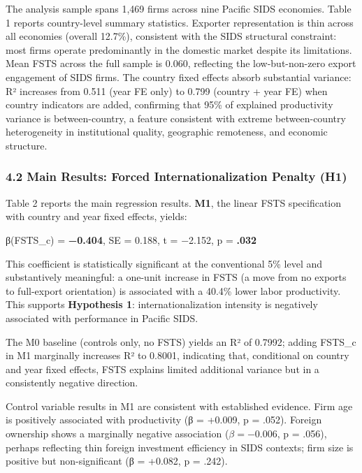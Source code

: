 \documentclass[12pt,a4paper]{article}
\begin{document}
The analysis sample spans 1,469 firms across nine Pacific SIDS
economies. Table 1 reports country-level summary statistics. Exporter
representation is thin across all economies (overall 12.7\%), consistent
with the SIDS structural constraint: most firms operate predominantly in
the domestic market despite its limitations. Mean FSTS across the full
sample is 0.060, reflecting the low-but-non-zero export engagement of
SIDS firms. The country fixed effects absorb substantial variance: R²
increases from 0.511 (year FE only) to 0.799 (country + year FE) when
country indicators are added, confirming that 95\% of explained
productivity variance is between-country, a feature consistent with
extreme between-country heterogeneity in institutional quality,
geographic remoteness, and economic structure.

\hypertarget{42-main-results-forced-internationalization-penalty-h1}{%
\subsubsection{4.2 Main Results: Forced Internationalization Penalty
(H1)}\label{42-main-results-forced-internationalization-penalty-h1}}

Table 2 reports the main regression results. \textbf{M1}, the linear
FSTS specification with country and year fixed effects, yields:

β(FSTS\_c) = \textbf{−0.404}, SE = 0.188, t = −2.152, p = \textbf{.032}

This coefficient is statistically significant at the conventional 5\%
level and substantively meaningful: a one-unit increase in FSTS (a move
from no exports to full-export orientation) is associated with a 40.4\%
lower labor productivity. This supports \textbf{Hypothesis 1}:
internationalization intensity is negatively associated with performance
in Pacific SIDS.

The M0 baseline (controls only, no FSTS) yields an R² of 0.7992; adding
FSTS\_c in M1 marginally increases R² to 0.8001, indicating that,
conditional on country and year fixed effects, FSTS explains limited
additional variance but in a consistently negative direction.

Control variable results in M1 are consistent with established evidence.
Firm age is positively associated with productivity (β = +0.009, p =
.052). Foreign ownership shows a marginally negative association
(\(\beta = −0.006\), p = .056), perhaps reflecting thin foreign
investment efficiency in SIDS contexts; firm size is positive but
non-significant (β = +0.082, p = .242).
\end{document}
